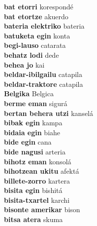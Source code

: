 \textbf{ bat etorri  } korespondé \\
\textbf{ bat etortze  } akuerdo \\
\textbf{ bateria elektriko  } bateria \\
\textbf{ batuketa egin  } konta \\
\textbf{ begi-lauso  } catarata \\
\textbf{ behatz lodi  } dede \\
\textbf{ behea jo  } kai \\
\textbf{ beldar-ibilgailu  } catapila \\
\textbf{ beldar-traktore  } catapila \\
\textbf{ Belgika  } Belgica \\
\textbf{ berme eman  } sigurá \\
\textbf{ bertan behera utzi  } kanselá \\
\textbf{ bibak egin  } kampa \\
\textbf{ bidaia egin  } biahe \\
\textbf{ bide egin  } cana \\
\textbf{ bide nagusi  } arteria \\
\textbf{ bihotz eman  } konsolá \\
\textbf{ bihotzean ukitu  } afektá \\
\textbf{ billete-zorro  } kartera \\
\textbf{ bisita egin  } bishitá \\
\textbf{ bisita-txartel  } karchi \\
\textbf{ bisonte amerikar  } bison \\
\textbf{ bitsa atera  } skuma \\
